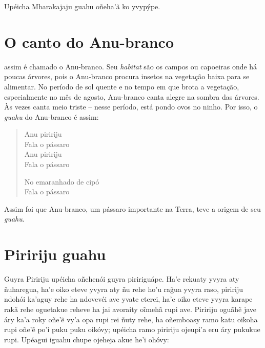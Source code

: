 Upéicha Mbarakajaju guahu oñeha'ã ko yvypýpe.

\chapter{O canto do Anu-branco}

 assim é chamado o Anu-branco. Seu \emph{habitat} são os campos
ou capoeiras onde há poucas árvores, pois o Anu-branco procura insetos
na vegetação baixa para se alimentar. No período de sol quente e no
tempo em que brota a vegetação, especialmente no mês de agosto,
Anu-branco canta alegre na sombra das árvores. Às vezes canta meio
triste -- nesse período, está pondo ovos no ninho. Por isso, o
\emph{guahu} do Anu-branco é assim:

\begin{verse}
Anu piririju\footnotemark{}\\
Fala o pássaro\\
Anu piririju\\
Fala o pássaro

No emaranhado de cipó\footnotemark{}\\
Fala o pássaro
\end{verse}




Assim foi que Anu-branco, um pássaro importante na Terra, teve a origem
de seu \emph{guahu}.

\chapter{Piririju guahu}

Guyra Piririju upéicha oñehenói guyra piririguápe. Ha'e rekuaty yvyra
aty ñuharegua, ha'e oiko eteve yvyra aty ñu rehe ho'u rag̃ua yvyra raso,
piririju ndohói ka'aguy rehe ha ndovevéi ave yvate eterei, ha'e oiko
eteve yvyra karape rakã rehe oguetakue reheve ha jai avoraity oĩmehã
rupi ave. Piririju oguãhẽ jave áry ka'a roky oñe'ẽ vy'a opa rupi rei
ñuty rehe, ha oñemboasy ramo katu oikoha rupi oñe'ẽ po'i puku puku
oikóvy; upéicha ramo piririju ojeupi'a eru áry pukukue rupi. Upéagui
iguahu chupe ojeheja akue he'i ohóvy:

